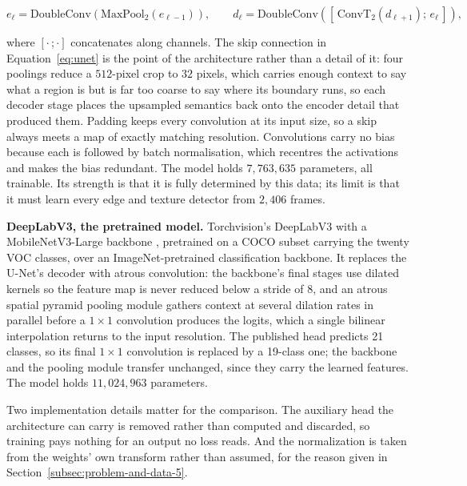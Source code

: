 \begin{equation}
    e_\ell = \mathrm{DoubleConv}(\mathrm{MaxPool}_2(e_{\ell-1})), \qquad
    d_\ell = \mathrm{DoubleConv}([\,\mathrm{ConvT}_2(d_{\ell+1});\, e_\ell\,]),
    \label{eq:unet}
\end{equation}

where $[\cdot\,;\cdot]$ concatenates along channels. The skip connection in
Equation~\ref{eq:unet} is the point of the architecture rather than a detail of it: four
poolings reduce a $512$-pixel crop to $32$ pixels, which carries enough context to say what a
region is but is far too coarse to say where its boundary runs, so each decoder stage places the
upsampled semantics back onto the encoder detail that produced them. Padding keeps every
convolution at its input size, so a skip always meets a map of exactly matching resolution.
Convolutions carry no bias because each is followed by batch normalisation, which recentres the
activations and makes the bias redundant. The model holds $7{,}763{,}635$ parameters, all
trainable. Its strength is that it is fully determined by this data; its limit is that it must
learn every edge and texture detector from $2{,}406$ frames.

\textbf{DeepLabV3, the pretrained model.} Torchvision's DeepLabV3 \cite{chen2017deeplabv3} with a
MobileNetV3-Large backbone \cite{howard2019mobilenetv3}, pretrained on a COCO subset
\cite{lin2014coco} carrying the twenty VOC classes, over an ImageNet-pretrained
\cite{deng2009imagenet} classification backbone. It replaces the U-Net's decoder with atrous
convolution: the backbone's final stages use dilated kernels so the feature map is never reduced
below a stride of $8$, and an atrous spatial pyramid pooling module gathers context at several
dilation rates in parallel before a $1 \times 1$ convolution produces the logits, which a single
bilinear interpolation returns to the input resolution. The published head predicts 21 classes,
so its final $1 \times 1$ convolution is replaced by a 19-class one; the backbone and the pooling
module transfer unchanged, since they carry the learned features. The model holds $11{,}024{,}963$ parameters.

Two implementation details matter for the comparison. The auxiliary head the architecture can
carry is removed rather than computed and discarded, so training pays nothing for an output no
loss reads. And the normalization is taken from the weights' own transform rather than assumed,
for the reason given in Section~\ref{subsec:problem-and-data-5}.

